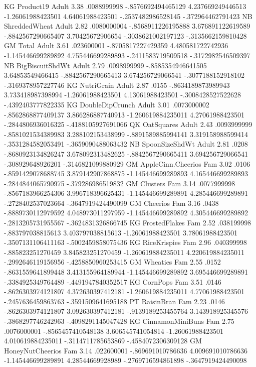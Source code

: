 KG	Product19	Adult	3.38	.0088999998	-.8576692494465129	4.237669249446513	-1.26061988423501	4.64061988423501	-.2537482986528145	-.372964462791423
NB	ShreddedWheat	Adult	2.82	.0080000004	-.8568911226195888	3.676891122619589	-.8842567290665407	3.70425672906654	-.3038621002197123	-.3135662159810428
GM	Total	Adult	3.61	.023600001	-.8705817227429359	4.480581722742936	-1.145446699289892	4.755446699289893	-.2411583719509518	-.3172982546509397
NB	BigBiscuitShdWt	Adult	2.79	.0098999999	-.8585354946641505	3.64853549466415	-.8842567290665413	3.674256729066541	-.3077188152918102	-.3169378957227746
KG	NutriGrain	Adult	2.87	.0155	-.8634189873989943	3.733418987398994	-1.26061988423501	4.13061988423501	-.3008428527522628	-.4392403777822335
KG	DoubleDipCrunch	Adult	3.01	.0073000002	-.8562868877409137	3.866286887740913	-1.260619884235011	4.27061988423501	-.2844806936016325	-.4188105927691066
QK	OatSquares	Adult	2.43	.0093999999	-.8581021534389983	3.288102153438999	-.8891589885994141	3.319158988599414	-.3531284582053491	-.3659090488063432
NB	SpoonSizeShdWt	Adult	2.81	.0208	-.8680923134826247	3.678092313482625	-.8842567290665411	3.694256729066541	-.308929648926201	-.3146821099880929
GM	AppleCinn.Cheerios	Fam	3.02	.0106	-.8591429078688745	3.879142907868875	-1.145446699289893	4.165446699289893	-.2844844065790975	-.379286986519832
GM	Clusters	Fam	3.14	.0077999998	-.8567183966254306	3.996718396625431	-1.145446699289891	4.285446699289891	-.2728402537023664	-.3647919424490099
GM	Cheerios	Fam	3.16	.0438	-.8889730112979592	4.048973011297959	-1.145446699289892	4.305446699289892	-.2813205731955567	-.3624831326866745
KG	FrostedFlakes	Fam	2.52	.038199998	-.883797038815613	3.403797038815613	-1.26061988423501	3.78061988423501	-.3507131106411163	-.5002459858075436
KG	RiceKrispies	Fam	2.96	.040399998	-.885823251270459	3.845823251270459	-1.260619884235011	4.220619884235011	-.2992646119156956	-.4258850960253415
GM	Wheaties	Fam	2.55	.0152	-.8631559641899448	3.413155964189944	-1.145446699289892	3.695446699289891	-.3384925349764489	-.4491947840352517
KG	CornPops	Fam	3.51	.0146	-.8626303974121807	4.372630397412181	-1.260619884235011	4.77061988423501	-.2457636459863763	-.3591509641695188
PT	RaisinBran	Fam	2.23	.0146	-.8626303974121807	3.092630397412181	-.9139189253455764	3.143918925345576	-.3868297746242963	-.4098291145047428
KG	CinnamonMiniBuns	Fam	2.75	.0076000001	-.8565457410548138	3.606545741054814	-1.26061988423501	4.010619884235011	-.3114711785653869	-.4584072306309128
GM	HoneyNutCheerios	Fam	3.14	.022600001	-.869691010786636	4.009691010786636	-1.145446699289891	4.28544669928989	-.2769716594861898	-.3647919424490098
